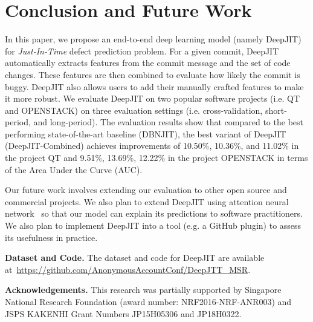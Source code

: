 \section{Conclusion and Future Work}
\label{sec:conclusion}
In this paper, we propose an end-to-end deep learning model (namely DeepJIT) for \emph{Just-In-Time} defect prediction problem. For a given commit, DeepJIT automatically extracts features from the commit message and the set of code changes. These features are then combined to evaluate how likely the commit is buggy. DeepJIT also allows users to add their manually crafted features to make it more robust. We evaluate DeepJIT on two popular software projects (i.e. QT and OPENSTACK) on three evaluation settings (i.e. cross-validation, short-period, and long-period). The evaluation results show that compared to the best performing state-of-the-art baseline (DBNJIT), the best variant of DeepJIT (DeepJIT-Combined) achieves improvements of 10.50\%, 10.36\%, and 11.02\% in the project QT and 9.51\%, 13.69\%, 12.22\% in the project OPENSTACK in terms of the Area Under the Curve (AUC).

Our future work involves extending our evaluation to other open source and commercial projects. We also plan to extend DeepJIT using attention neural network~\cite{yin2016abcnn} so that our model can explain its predictions to software practitioners. We also plan to implement DeepJIT into a tool (e.g. a GitHub plugin) to assess its usefulness in practice.

\noindent \textbf{Dataset and Code.} The dataset and code for DeepJIT are available at~\url{https://github.com/AnonymousAccountConf/DeepJTT_MSR}.

\noindent \textbf{Acknowledgements.} This research was partially supported by Singapore National Research Foundation (award number: NRF2016-NRF-ANR003) and JSPS KAKENHI Grant Numbers JP15H05306 and JP18H0322.

